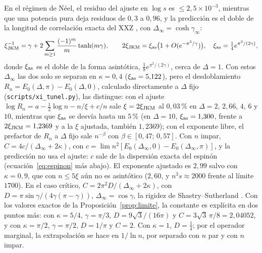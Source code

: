 \documentclass[11pt,a4paper]{article}
\theoremstyle{remark}
\begin{document}
En el régimen de Néel, el residuo del ajuste en $\log s$ es $\le2{,}5\times10^{-3}$, mientras que una
potencia pura deja residuos de $0{,}3$ a $0{,}96$, y la predicción es el doble de la longitud de correlación exacta del XXZ
\cite{jkm}, con $\Delta_\infty=\cosh\gamma_\infty$:
\[
  \xi_{\rm JKM}^{-1}=\gamma+2\sum_{m\ge1}\frac{(-1)^m}m\tanh(m\gamma),\qquad
  2\xi_{\rm JKM}=\xi_{\rm as}\big(1+O(e^{-\pi^2/\gamma})\big),\quad
  \xi_{\rm as}=\tfrac14e^{\pi^2/(2\gamma)},
\]
donde $\xi_{\rm as}$ es el doble de la forma asintótica, $\tfrac18e^{\pi^2/(2\gamma)}$, cerca de
$\Delta=1$. Con estos $\Delta_\infty$ las dos solo se separan en $\kappa=0{,}4$ ($\xi_{\rm as}=5{,}122$),
pero el desdoblamiento $R_n=E_0(\Delta,\pi)-E_0(\Delta,0)$, calculado directamente a $\Delta$ fijo
(\texttt{scripts/xi\_tunel.py}), las distingue: con el ajuste
$\log R_n=a-\tfrac12\log n-n/\xi+c/n$ sale $\xi=2\xi_{\rm JKM}$ al $0{,}03$\,\% en
$\Delta=2$, $2{,}66$, $4$, $6$ y $10$, mientras que $\xi_{\rm as}$ se desvía hasta un $5$\,\% (en
$\Delta=10$, $\xi_{\rm as}=1{,}300$, frente a $2\xi_{\rm JKM}=1{,}2369$ y a la $\xi$ ajustada,
también $1{,}2369$); con el exponente libre, el prefactor de $R_n$ a $\Delta$ fijo sale
$n^{-\beta}$ con $\beta\in[0{,}47;\,0{,}57]$. Con $n$ impar,
$C=4c/(\Delta_\infty+2\kappa)$, con $c=\lim n^2[E_0(\Delta_\infty,0)-E_0(\Delta_\infty,\pi)]$, y la
predicción no usa el ajuste: $c$ sale de la dispersión exacta del espinón (ecuación~\eqref{eq:espinon}
más abajo). El exponente ajustado es $2{,}99$ salvo con $\kappa=0{,}9$, que con $n\le5\xi$ aún no es
asintótico ($2{,}60$, y $n^3s\approx2000$ frente al límite $1700$). En el caso crítico, $C=2\pi^2D/(\Delta_\infty+2\kappa)$, con
$D=\pi\sin\gamma/(4\gamma(\pi-\gamma))$, $\Delta_\infty=\cos\gamma$, la rigidez de
Shastry--Sutherland \cite{shastry}. Con los valores exactos de la Proposición~\ref{prop:limite},
la constante es explícita en dos puntos más: con $\kappa=5/4$, $\gamma=\pi/3$, $D=9\sqrt3/(16\pi)$ y
$C=3\sqrt3\,\pi/8=2{,}04052$, y con $\kappa=\pi/2$, $\gamma=\pi/2$, $D=1/\pi$ y $C=2$. Con
$\kappa=1$, $D=\tfrac14$; por el operador marginal, la extrapolación se hace en $1/\ln n$, por
separado con $n$ par y con $n$ impar.
\end{document}
